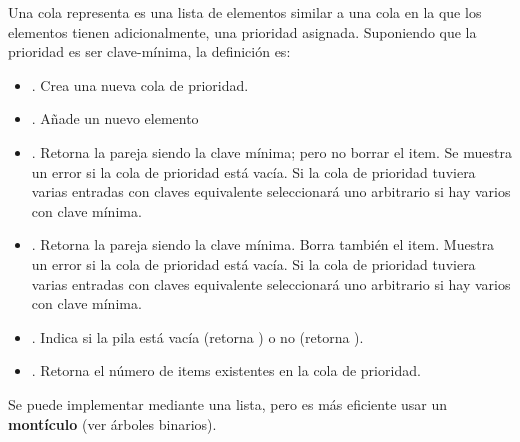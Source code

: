 


\begin{definition}{}\label{def:ColaPrioridad}

Una cola representa es una lista de elementos similar a una cola en la que los elementos tienen adicionalmente, una prioridad asignada.
Suponiendo que la prioridad es ser clave-mínima, la definición es:
\begin{itemize}
\item {}. Crea una nueva cola de prioridad.

\item {}. Añade un nuevo elemento  

\item  {}. Retorna  la pareja  siendo   la clave mínima; pero no borrar el item. Se muestra un error si la cola de prioridad está vacía. Si la cola de prioridad tuviera varias entradas con claves equivalente seleccionará uno arbitrario si hay varios con clave mínima.

\item {}. Retorna la pareja  siendo   la clave mínima. Borra también el item. Muestra un error si la cola de prioridad está vacía.  Si la cola de prioridad tuviera varias entradas con claves equivalente seleccionará uno arbitrario si hay varios con clave mínima.


\item {}. Indica si la pila está vacía (retorna ) o no (retorna ).

\item {}. Retorna el número de items existentes en la cola de prioridad.
\end{itemize}

Se puede implementar mediante una lista, pero es más eficiente usar un \textbf{montículo} (ver árboles binarios).
\end{definition}
